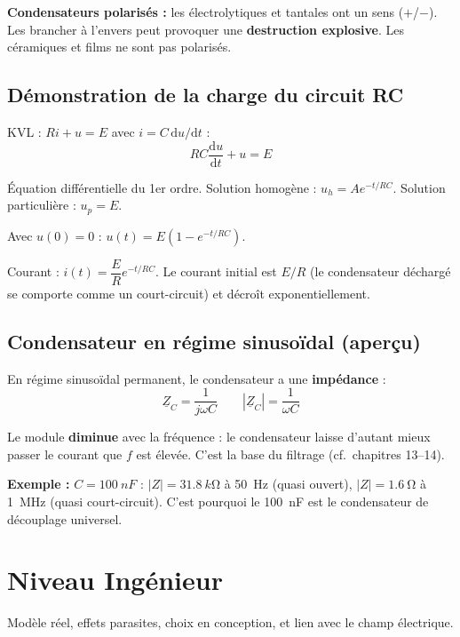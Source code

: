 \documentclass[12pt,a4paper,twoside]{book}
\begin{document}
\begin{attention}
\textbf{Condensateurs polarisés :} les électrolytiques et tantales ont un sens ($+$/$-$). Les brancher à l'envers peut provoquer une \textbf{destruction explosive}. Les céramiques et films ne sont pas polarisés.
\end{attention}

\subsection{Démonstration de la charge du circuit RC}

KVL : $Ri + u = E$ avec $i = C\,\mathrm{d}u/\mathrm{d}t$ :
\[
RC\frac{\mathrm{d}u}{\mathrm{d}t} + u = E
\]

Équation différentielle du 1er ordre. Solution homogène : $u_h = Ae^{-t/RC}$. Solution particulière : $u_p = E$.

Avec $u(0) = 0$ : $u(t) = E(1 - e^{-t/RC})$. \checkmark

Courant : $i(t) = \dfrac{E}{R}e^{-t/RC}$. Le courant initial est $E/R$ (le condensateur déchargé se comporte comme un court-circuit) et décroît exponentiellement.

\subsection{Condensateur en régime sinusoïdal (aperçu)}

En régime sinusoïdal permanent, le condensateur a une \textbf{impédance} :
\[
\underline{Z}_C = \frac{1}{j\omega C} \qquad |\underline{Z}_C| = \frac{1}{\omega C}
\]

Le module \textbf{diminue} avec la fréquence : le condensateur laisse d'autant mieux passer le courant que $f$ est élevée. C'est la base du filtrage (cf.\ chapitres 13--14).

\begin{pratique}
\textbf{Exemple :} $C = \SI{100}{nF}$ : $|Z| = \SI{31.8}{k\ohm}$ à \SI{50}{Hz} (quasi ouvert), $|Z| = \SI{1.6}{\ohm}$ à \SI{1}{MHz} (quasi court-circuit). C'est pourquoi le \SI{100}{nF} est le condensateur de découplage universel.
\end{pratique}

\section{Niveau Ingénieur}

\begin{ingenieur}
Modèle réel, effets parasites, choix en conception, et lien avec le champ électrique.
\end{ingenieur}
\end{document}
